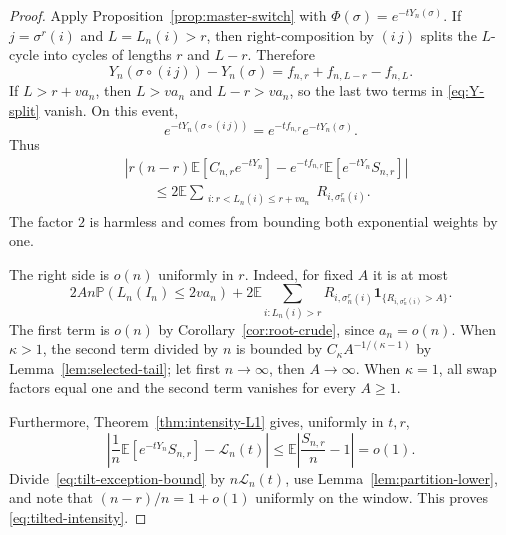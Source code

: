 \documentclass[11pt]{article}
\newcommand{\E}{\mathbb E}
\newcommand{\Pp}{\mathbb P}
\newcommand{\1}{\mathbf 1}
\newcommand{\cL}{\mathcal L}
\theoremstyle{definition}
\theoremstyle{remark}
\begin{document}
\begin{proof}
Apply Proposition~\ref{prop:master-switch} with
$\Phi(\sigma)=e^{-tY_n(\sigma)}$.  If $j=\sigma^r(i)$ and
$L=L_n(i)>r$, then right-composition by $(i\,j)$ splits the $L$-cycle
into cycles of lengths $r$ and $L-r$.  Therefore\begin{equation}\label{eq:Y-split}
  Y_n(\sigma\circ(i\,j))-Y_n(\sigma)
  =f_{n,r}+f_{n,L-r}-f_{n,L}.
\end{equation}
If $L>r+va_n$, then $L>va_n$ and $L-r>va_n$, so the last two terms in
\eqref{eq:Y-split} vanish.  On this event,
\[
  e^{-tY_n(\sigma\circ(i\,j))}
  =e^{-tf_{n,r}}e^{-tY_n(\sigma)}.
\]
Thus
\begin{align}
 &\left|
 r(n-r)\E[C_{n,r}e^{-tY_n}]
 -e^{-tf_{n,r}}\E[e^{-tY_n}S_{n,r}]
 \right|
 \nonumber\\
 &\qquad\leq
 2\E\sum_{\substack{i:r<L_n(i)\leq r+va_n}}
 R_{i,\sigma_n^r(i)}.
 \label{eq:tilt-exception-bound}
\end{align}
The factor $2$ is harmless and comes from bounding both exponential
weights by one.

The right side is $o(n)$ uniformly in $r$.  Indeed, for fixed $A$ it is
at most
\[
  2A n\Pp(L_n(I_n)\leq2va_n)
  +2\E\sum_{i:L_n(i)>r}
     R_{i,\sigma_n^r(i)}\1_{\{R_{i,\sigma_n^r(i)}>A\}}.
\]
The first term is $o(n)$ by Corollary~\ref{cor:root-crude}, since
$a_n=o(n)$.  When $\kappa>1$, the second term divided by $n$ is bounded
by $C_\kappa A^{-1/(\kappa-1)}$ by
Lemma~\ref{lem:selected-tail}; let first $n\to\infty$, then
$A\to\infty$.  When $\kappa=1$, all swap factors equal one and the
second term vanishes for every $A\geq1$.

Furthermore, Theorem~\ref{thm:intensity-L1} gives, uniformly in $t,r$,
\begin{equation}\label{eq:weighted-S}
 \left|
 \frac1n\E[e^{-tY_n}S_{n,r}]-\cL_n(t)
 \right|
 \leq
 \E\left|\frac{S_{n,r}}n-1\right|=o(1).
\end{equation}
Divide~\eqref{eq:tilt-exception-bound} by
$n\cL_n(t)$, use Lemma~\ref{lem:partition-lower}, and note that
$(n-r)/n=1+o(1)$ uniformly on the window.  This proves
\eqref{eq:tilted-intensity}.
\end{proof}
\end{document}
